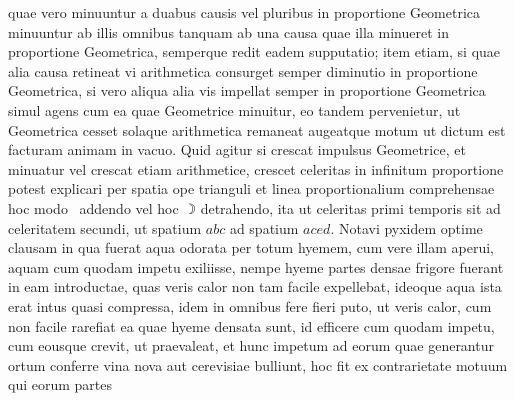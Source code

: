 quae vero mi\-nu\-untur a duabus causis vel pluribus in proportione Geometrica minuuntur ab illis omnibus tanquam ab una causa quae illa minueret in proportione Geometrica, semperque redit eadem supputatio; item etiam, si quae alia causa retineat vi arithmetica consurget semper diminutio in proportione Geometrica, si vero aliqua alia vis impellat%
semper in proportione Geometrica simul agens cum ea quae Geometrice minuitur, eo tandem pervenietur, ut Geometrica cesset solaque arithmetica remaneat augeatque motum ut dictum est facturam animam in vacuo.
Quid agitur si crescat impulsus Geometrice, et minuatur vel crescat etiam arithmetice, crescet celeritas in infinitum proportione
pot\-est explicari per spatia ope trianguli et
linea proportionalium comprehensae hoc modo \astrosun\ addendo vel hoc $\rightmoon$ detrahendo, ita ut celeritas primi temporis sit ad celeritatem secundi, ut spatium $abc$ ad spatium $aced.$
\pend%
\pstart%
Notavi pyxidem optime clausam in qua fuerat aqua odorata per totum hyemem, cum vere illam aperui, aquam cum quodam impetu exiliisse, nempe hyeme partes densae frigore fuerant in eam introductae, quas veris calor non tam facile expellebat, ideoque aqua ista erat intus quasi compressa, idem in omnibus fere fieri puto, ut veris calor, cum non facile rarefiat ea quae hyeme densata sunt, id efficere cum quodam impetu, cum eousque crevit, ut praevaleat, et hunc impetum ad eorum quae
generantur ortum conferre
vina nova aut cerevisiae bulliunt, hoc fit ex contrarietate motuum qui
eorum partes%
